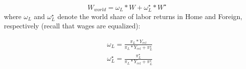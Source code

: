 \documentclass[notitlepage,12pt]{article}
\begin{document}
\begin{equation}
W_{world} = \omega_L*W + \omega_L^\star*W^\star
\end{equation}
where $\omega_L$ and $\omega_L^\star$ denote the world share of labor
returns in Home and Foreign, respectively (recall that wages are equalized):

\begin{align}
&\omega_L = \frac{\pi_L*Y_{rel}}{\pi_L*Y_{rel} + \pi_L^\star} \\
&\omega_L^\star = \frac{\pi_L^\star}{\pi_L*Y_{rel} + \pi_L^\star}
\end{align}
\end{document}
